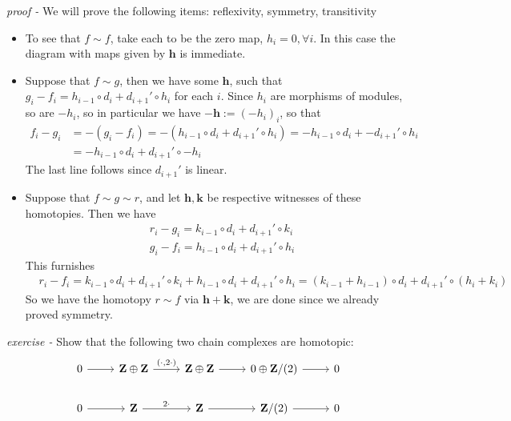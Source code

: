 \documentclass[11pt]{article}
\theoremstyle{definition}
\begin{document}
\emph{proof - } We will prove the following items: reflexivity, symmetry, transitivity
\begin{itemize}
    \item To see that \(f \sim f\), take each to be the zero map, \(h_i = 0, \forall i\). In this case the diagram with maps given by \(\mathbf{h}\) is immediate.
    \item Suppose that \(f \sim g\), then we have some \(\mathbf{h}\), such that \(g_i -f_i = h_{i-1}\circ d_i + d_{i+1}' \circ h_i\) for each \(i\). Since \(h_i\) are morphisms of modules, so are \(-h_i\), so in particular we have \(\mathbf{-h} := (-h_i)_i\), so that 
    \begin{align*}
        f_i - g_i &= -(g_i - f_i) = -(h_{i-1}\circ d_i + d_{i+1}' \circ h_i) = -h_{i-1}\circ d_i + -d_{i+1}' \circ h_i \\
        &= -h_{i-1}\circ d_i + d_{i+1}' \circ -h_i
    \end{align*}
    The last line follows since \(d_{i+1}'\) is linear.
    \item Suppose that \(f \sim g \sim r\), and let \(\mathbf{h, k}\) be respective witnesses of these homotopies. Then we have
    \begin{align*}
            &r_i - g_i = k_{i-1}\circ d_i + d_{i+1}'\circ k_i \\
            &g_i - f_i = h_{i-1}\circ d_i + d_{i+1}'\circ h_i
    \end{align*}
    This furnishes
    \begin{align*}
        &r_i - f_i = k_{i-1}\circ d_i + d_{i+1}'\circ k_i + h_{i-1}\circ d_i + d_{i+1}'\circ h_i
                   = (k_{i-1} + h_{i-1})\circ d_i + d_{i+1}'\circ(h_i + k_i)
    \end{align*}
    So we have the homotopy \(r \sim f\) via \(\mathbf{h} + \mathbf{k}\), we are done since we already proved symmetry.
\end{itemize}




\emph{exercise - }\label{CCEx3} Show that the following two chain complexes are homotopic:
\begin{equation*}
    \begin{tikzcd}
        0 \arrow[r] & \mathbf{Z} \oplus \mathbf{Z} \arrow[r,"{(\cdot , 2\cdot)}"] & \mathbf{Z} \oplus \mathbf{Z} \arrow[r] & 0 \oplus \mathbf{Z}/(2) \arrow[r] & 0 \\
        0 \arrow[r] & \mathbf{Z} \arrow[r,"2\cdot"] & \mathbf{Z} \arrow[r] & \mathbf{Z}/(2) \arrow[r] & 0
    \end{tikzcd}
\end{equation*}
\end{document}
